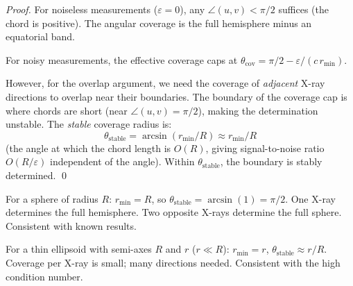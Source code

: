 \begin{proof}
For noiseless measurements ($\varepsilon = 0$), any $\angle(u,v) < \pi/2$ suffices (the chord is positive). The angular coverage is the full hemisphere minus an equatorial band.

For noisy measurements, the effective coverage caps at $\theta_{\mathrm{cov}} = \pi/2 - \varepsilon/(c\,r_{\min})$.

However, for the overlap argument, we need the coverage of \emph{adjacent} X-ray directions to overlap near their boundaries. The boundary of the coverage cap is where chords are short (near $\angle(u,v) = \pi/2$), making the determination unstable. The \emph{stable} coverage radius is:
\[
  \theta_{\mathrm{stable}} = \arcsin(r_{\min}/R) \approx r_{\min}/R
\]
(the angle at which the chord length is $O(R)$, giving signal-to-noise ratio $O(R/\varepsilon)$ independent of the angle). Within $\theta_{\mathrm{stable}}$, the boundary is stably determined. \qed
\end{proof}

\begin{remark}
For a sphere of radius $R$: $r_{\min} = R$, so $\theta_{\mathrm{stable}} = \arcsin(1) = \pi/2$. One X-ray determines the full hemisphere. Two opposite X-rays determine the full sphere. Consistent with known results.

For a thin ellipsoid with semi-axes $R$ and $r$ ($r \ll R$): $r_{\min} = r$, $\theta_{\mathrm{stable}} \approx r/R$. Coverage per X-ray is small; many directions needed. Consistent with the high condition number.
\end{remark}



